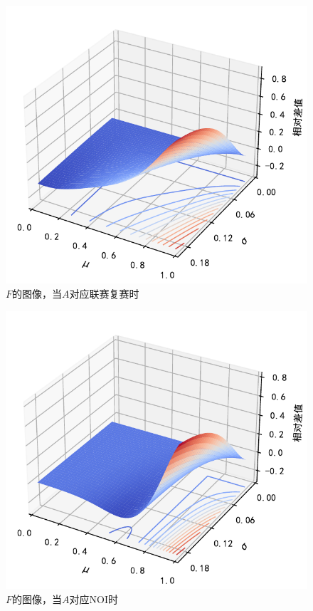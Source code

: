             \begin{figure}[hp]
                \centering
                \includegraphics[width=\textwidth]{fig/plottingNoipD_1D_2WrtSigma.pdf}
                \caption{$F$的图像，当$A$对应联赛复赛时}
                \label{fig:plottingD_1D_2forNoipWrtSigma}
            \end{figure}

            \begin{figure}[hp]
                \centering
                \includegraphics[width=\textwidth]{fig/plottingNoiD_1D_2WrtSigma.pdf}
                \caption{$F$的图像，当$A$对应NOI时}
                \label{fig:plottingD_1D_2forNoiWrtSigma}
            \end{figure}


